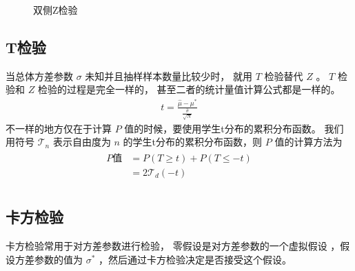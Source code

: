 \documentclass[letterpaper,10pt,english]{sphinxmanual}
\begin{document}
\begin{figure}[htbp]
\centering
\capstart

\noindent{}
\caption{双侧Z检验}\label{\detokenize{_u63a8_u65ad_u4e0e_u68c0_u9a8c/content:id35}}\label{\detokenize{_u63a8_u65ad_u4e0e_u68c0_u9a8c/content:pic-influence-111}}\end{figure}


\subsection{T检验}
\label{\detokenize{_u63a8_u65ad_u4e0e_u68c0_u9a8c/content:id23}}
当总体方差参数 \(\sigma\) 未知并且抽样样本数量比较少时，
就用 \(T\) 检验替代 \(Z\) 。
\(T\) 检验和 \(Z\) 检验的过程是完全一样的，
甚至二者的统计量值计算公式都是一样的。
\begin{equation}\label{equation:推断与检验/content:推断与检验/content:93}
\begin{split}t = \frac{\hat{\mu} - \mu^* }{\frac{\hat{\sigma}}{\sqrt{N}}}\end{split}
\end{equation}
不一样的地方仅在于计算 \(P\) 值的时候，要使用学生t分布的累积分布函数。
我们用符号 \(\mathcal{T}_{n}\) 表示自由度为 \(n\)
的学生t分布的累积分布函数，则 \(P\) 值的计算方法为
\begin{align}\label{equation:推断与检验/content:推断与检验/content:94}\!\begin{aligned}
P\text{值} &= P(T \geq t) + P(T \leq -t)\\
&= 2 \mathcal{T}_d(-t)\\
\end{aligned}\end{align}

\subsection{卡方检验}
\label{\detokenize{_u63a8_u65ad_u4e0e_u68c0_u9a8c/content:id24}}
卡方检验常用于对方差参数进行检验，
零假设是对方差参数的一个虚拟假设
，假设方差参数的值为 \(\sigma^*\)
，然后通过卡方检验决定是否接受这个假设。
\end{document}
